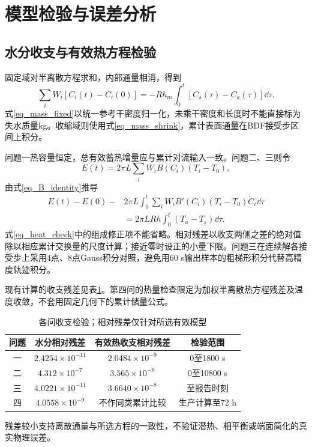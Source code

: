 \section{模型检验与误差分析}
\subsection{水分收支与有效热方程检验}
固定域对半离散方程求和，内部通量相消，得到
\begin{equation}\label{eq_mass_fixed}
\sum_iW_i[C_i(t)-C_i(0)]
=-Rh_m\int_0^t[C_s(\tau)-C_a(\tau)]\dd\tau.
\end{equation}
式\eqref{eq_mass_fixed}以统一参考干密度归一化，未乘干密度和长度时不能直接标为失水质量kg。收缩域则使用式\eqref{eq_mass_shrink}，累计表面通量在BDF接受步区间上积分。

问题一热容量恒定，总有效蓄热增量应与累计对流输入一致。问题二、三则令
\[
E(t)=2\pi L\sum_iW_iB(C_i)(T_i-T_0),
\]
由式\eqref{eq_B_identity}推导
\begin{equation}\label{eq_heat_check}
\begin{split}
E(t)-E(0){}-&2\pi L\int_0^t\sum_iW_iB'(C_i)(T_i-T_0)\dot C_i\dd\tau\\
&=2\pi LRh\int_0^t(T_a-T_s)\dd\tau.
\end{split}
\end{equation}
式\eqref{eq_heat_check}中的组成修正项不能省略。相对残差以收支两侧之差的绝对值除以相应累计交换量的尺度计算；接近零时设正的小量下限。问题三在连续解各接受步上采用4点、8点Gauss积分对照，避免用60 s输出样本的粗梯形积分代替高精度轨迹积分。

现有计算的收支残差见表\ref{tab_balance}。第四问的热量检查限定为加权半离散热方程残差及温度收敛，不套用固定几何下的累计储量公式。
\begin{table}[htbp]\centering\small
\caption{各问收支检验；相对残差仅针对所选有效模型}\label{tab_balance}
\begin{tabular}{cccc}\toprule
问题 & 水分相对残差 & 有效热收支相对残差 & 检验范围\\\midrule
一 & $2.4254\times10^{-11}$ & $2.0484\times10^{-9}$ & 0至1800 s\\
二 & $4.312\times10^{-7}$ & $3.565\times10^{-8}$ & 0至10800 s\\
三 & $4.0221\times10^{-11}$ & $3.6640\times10^{-8}$ & 至报告时刻\\
四 & $4.0558\times10^{-9}$ & 不作同类累计比较 & 生产计算至72 h\\\bottomrule
\end{tabular}
\end{table}
残差较小支持离散通量与所选方程的一致性，不验证潜热、相平衡或端面简化的真实物理误差。

